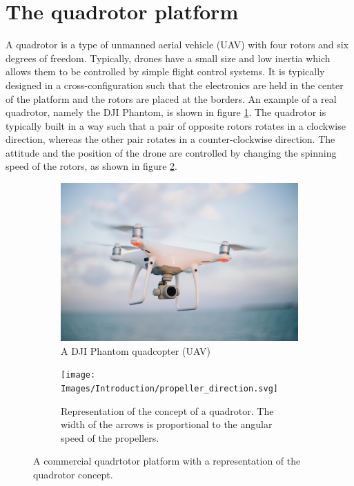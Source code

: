 \documentclass{thesisreport}
\begin{document}
 \section*{The quadrotor platform}

A quadrotor is a type of unmanned aerial vehicle (UAV) with four rotors and six degrees of freedom. Typically, drones have a small size and low inertia which allows them to be controlled by simple flight control systems. It is typically designed in a cross-configuration such that the electronics are held in the center of the platform and the rotors are placed at the borders.
An example of a real quadrotor, namely the DJI Phantom, is shown in figure \ref{fig:drone}. The quadrotor is typically built in a way such that a pair of opposite rotors rotates in a clockwise direction, whereas the other pair rotates in a counter-clockwise direction.
The attitude and the position of the drone are controlled by changing the spinning speed of the rotors, as shown in figure \ref{fig:propeller_directions}.
 
 \begin{figure}[h]
     \centering
     \begin{subfigure}[b]{0.45\textwidth}
         \centering
         \includegraphics[width=\textwidth]{Images/Introduction/drone}
         \caption[Caption for LOF]{A DJI Phantom quadcopter (UAV)\protect\footnotemark}
         \label{fig:drone}
     \end{subfigure}
     \hfill
     \begin{subfigure}[b]{0.45\textwidth}
         \centering
         \texttt{[image: Images/Introduction/propeller\_direction.svg]}
         \caption{Representation of the concept of a quadrotor. The width of the arrows is proportional to the angular speed of the propellers.\cite{Bouabdalla2007}}
         \label{fig:propeller_directions}
     \end{subfigure}
        \caption{A commercial quadrtotor platform with a representation of the quadrotor concept.}
        \label{fig:three graphs}
\end{figure}
\end{document}
